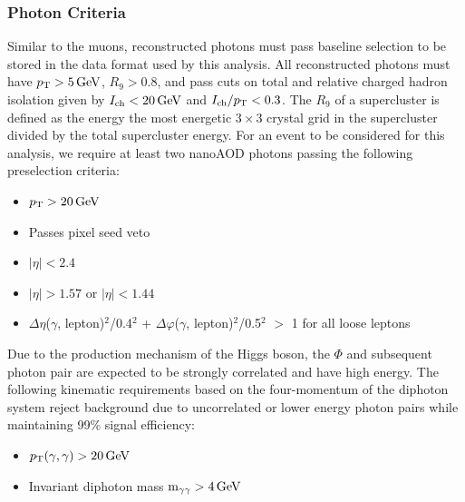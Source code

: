 \subsubsection{Photon Criteria} \label{sec:ana_photons}
Similar to the muons, reconstructed photons must pass baseline selection to be stored in the data format used by this analysis. All reconstructed photons must have $p_{\mathrm{T}}>5\,\text{Ge\hspace{-.08em}V}$, $R_9>0.8$, and pass cuts on total and relative charged hadron isolation given by $I_\text{ch}<20\,\text{Ge\hspace{-.08em}V}$ and $I_\text{ch}/p_{\mathrm{T}}<0.3$. The $R_9$ of a supercluster is defined as the energy the most energetic $3\times3$ crystal grid in the supercluster divided by the total supercluster energy. For an event to be considered for this analysis, we require at least two nanoAOD photons passing the following preselection criteria:
\begin{itemize}
	\item $p_{\mathrm{T}}>20\,\text{Ge\hspace{-.08em}V}$
	\item Passes pixel seed veto
	\item $|\eta|<2.4$
	\item $|\eta|>1.57\text{ or }|\eta|<1.44$
	\item $\Delta\eta$($\gamma$, lepton)$^2$/0.4$^2$ + $\Delta\varphi$($\gamma$, lepton)$^2$/0.5$^2$ $>$ 1 for all loose leptons
\end{itemize}

Due to the production mechanism of the Higgs boson, the $\Phi$ and subsequent photon pair are expected to be strongly correlated and have high energy. The following kinematic requirements based on the four-momentum of the diphoton system reject background due to uncorrelated or lower energy photon pairs while maintaining 99\% signal efficiency:
\begin{itemize}
	\item $p_{\mathrm{T}}(\gamma,\gamma)>20\,\text{Ge\hspace{-.08em}V}$
	\item Invariant diphoton mass $\text{m}_{\gamma\gamma}>4\,\text{Ge\hspace{-.08em}V}$
\end{itemize}

